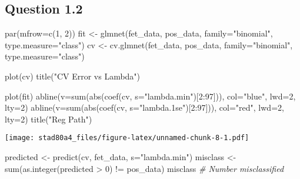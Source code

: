 \documentclass[
]{article}
\newenvironment{Shaded}{\begin{snugshade}}{\end{snugshade}}
\newcommand{\AttributeTok}[1]{\textcolor[rgb]{0.77,0.63,0.00}{#1}}
\newcommand{\CommentTok}[1]{\textcolor[rgb]{0.56,0.35,0.01}{\textit{#1}}}
\newcommand{\DecValTok}[1]{\textcolor[rgb]{0.00,0.00,0.81}{#1}}
\newcommand{\FunctionTok}[1]{\textcolor[rgb]{0.00,0.00,0.00}{#1}}
\newcommand{\NormalTok}[1]{#1}
\newcommand{\OtherTok}[1]{\textcolor[rgb]{0.56,0.35,0.01}{#1}}
\newcommand{\SpecialCharTok}[1]{\textcolor[rgb]{0.00,0.00,0.00}{#1}}
\newcommand{\StringTok}[1]{\textcolor[rgb]{0.31,0.60,0.02}{#1}}
\begin{document}
\hypertarget{question-1.2}{%
\subsection{Question 1.2}\label{question-1.2}}

\begin{Shaded}
\begin{Highlighting}[]
\FunctionTok{par}\NormalTok{(}\AttributeTok{mfrow=}\FunctionTok{c}\NormalTok{(}\DecValTok{1}\NormalTok{, }\DecValTok{2}\NormalTok{))}
\NormalTok{fit }\OtherTok{\textless{}{-}} \FunctionTok{glmnet}\NormalTok{(fet\_data, pos\_data, }\AttributeTok{family=}\StringTok{"binomial"}\NormalTok{, }\AttributeTok{type.measure=}\StringTok{"class"}\NormalTok{)}
\NormalTok{cv }\OtherTok{\textless{}{-}} \FunctionTok{cv.glmnet}\NormalTok{(fet\_data, pos\_data, }\AttributeTok{family=}\StringTok{"binomial"}\NormalTok{, }\AttributeTok{type.measure=}\StringTok{"class"}\NormalTok{)}

\FunctionTok{plot}\NormalTok{(cv)}
\FunctionTok{title}\NormalTok{(}\StringTok{"CV Error vs Lambda"}\NormalTok{)}

\FunctionTok{plot}\NormalTok{(fit)}
\FunctionTok{abline}\NormalTok{(}\AttributeTok{v=}\FunctionTok{sum}\NormalTok{(}\FunctionTok{abs}\NormalTok{(}\FunctionTok{coef}\NormalTok{(cv, }\AttributeTok{s=}\StringTok{"lambda.min"}\NormalTok{)[}\DecValTok{2}\SpecialCharTok{:}\DecValTok{97}\NormalTok{])), }\AttributeTok{col=}\StringTok{"blue"}\NormalTok{, }\AttributeTok{lwd=}\DecValTok{2}\NormalTok{, }\AttributeTok{lty=}\DecValTok{2}\NormalTok{)}
\FunctionTok{abline}\NormalTok{(}\AttributeTok{v=}\FunctionTok{sum}\NormalTok{(}\FunctionTok{abs}\NormalTok{(}\FunctionTok{coef}\NormalTok{(cv, }\AttributeTok{s=}\StringTok{"lambda.1se"}\NormalTok{)[}\DecValTok{2}\SpecialCharTok{:}\DecValTok{97}\NormalTok{])), }\AttributeTok{col=}\StringTok{"red"}\NormalTok{, }\AttributeTok{lwd=}\DecValTok{2}\NormalTok{, }\AttributeTok{lty=}\DecValTok{2}\NormalTok{)}
\FunctionTok{title}\NormalTok{(}\StringTok{"Reg Path"}\NormalTok{)}
\end{Highlighting}
\end{Shaded}

\texttt{[image: stad80a4\_files/figure-latex/unnamed-chunk-8-1.pdf]}

\begin{Shaded}
\begin{Highlighting}[]
\NormalTok{predicted }\OtherTok{\textless{}{-}} \FunctionTok{predict}\NormalTok{(cv, fet\_data, }\AttributeTok{s=}\StringTok{"lambda.min"}\NormalTok{)}
\NormalTok{misclass }\OtherTok{\textless{}{-}} \FunctionTok{sum}\NormalTok{(}\FunctionTok{as.integer}\NormalTok{(predicted }\SpecialCharTok{\textgreater{}} \DecValTok{0}\NormalTok{) }\SpecialCharTok{!=}\NormalTok{ pos\_data)}
\NormalTok{misclass }\CommentTok{\# Number misclassified}
\end{Highlighting}
\end{Shaded}
\end{document}
